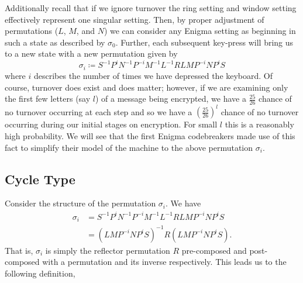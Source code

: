 \noindent Additionally recall that if we ignore turnover the ring setting and
window setting effectively represent one singular setting.
Then, by proper adjustment of permutations ($L$, $M$, and $N$) we can
consider any Enigma setting as beginning in such a state as described
by $\sigma_0$. Further, each subsequent key-press will bring us to a new
state with a new permutation given by
\[
  \sigma_i \coloneq S^{-1}P^{i}N^{-1}P^{-i}M^{-1}L^{-1}RLMP^{-i}NP^{i}S
\]
where $i$ describes the number of times we have depressed the
keyboard. Of course, turnover does exist and does matter; however, if
we are examining only the first few letters (say $l$) of a message
being encrypted, we have a $\frac{25}{26}$ chance of no turnover
occurring at each step and so we have a $(\frac{25}{26})^l$ chance of
no turnover occurring during our initial stages on encryption. For
small $l$ this is a reasonably high probability. We will see that the
first Enigma codebreakers made use of this
fact to simplify their model of the machine to the above permutation $\sigma_i$.

\subsection{Cycle Type}
Consider the structure of the permutation $\sigma_i$. We have
\begin{align*}
  \sigma_i & = S^{-1}P^{i}N^{-1}P^{-i}M^{-1}L^{-1}RLMP^{-i}NP^{i}S \\
  & = (LMP^{-i}NP^{i}S)^{-1}R(LMP^{-i}NP^{i}S).
\end{align*}
That is, $\sigma_i$ is simply the reflector permutation $R$
pre-composed and post-composed with a permutation and its inverse
respectively. This leads us to the following definition,

